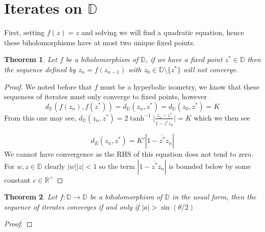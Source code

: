 \documentclass{article}
\newcommand{\R}{\mathbb{R}}
\newcommand{\D}{\mathbb{D}}
\newtheorem{theorem}{Theorem}
\begin{document}
\section{Iterates on $\D$}
First, setting $f(z) = z$ and solving we will find a quadratic equation, hence these biholomorphisms have at most two unique fixed points.
\begin{theorem}
    Let $f$ be a biholomorphism of $\D$, if we have a fixed point $z^*\in\D$ then the sequence defined by $z_n = f(z_{n-1})$ with $z_0\in\D\setminus\{z^*\}$ will not converge.
\end{theorem}
\begin{proof}
    We noted before that $f$ must be a hyperbolic isometry, we know that these sequences of iterates must only converge to fixed points, however
    \begin{equation*}
        d_\D(f(z_n), f(z^*)) = d_\D(z_n, z^*) = d_\D(z_0, z^*) = K
    \end{equation*}
    From this one may see, $d_\D(z_n, z^*) = 2 \tanh^{-1}\bigg|\frac{z_n - z^*}{1-\overline{z^*}z_n} \bigg|  = K$ which we then see 

    \begin{equation*}
        d_E(z_n, z^*) = K'|1-\overline{z^*}z_n|
    \end{equation*}
    We cannot have convergence as the RHS of this equation does not tend to zero. For $w, z\in\D$ clearly $|w||z| < 1$ so the term $|1-\overline{z^*}z_n|$ is bounded below by some constant $c\in\R^+$
\end{proof}
\begin{theorem}
    Let $f:\D\to\D$ be a biholomorphism of $\D$ in the usual form, then the sequence of iterates converges if and only if $|a| > \sin(\theta/2)$
\end{theorem}
\begin{proof}

\end{proof}
\end{document}

